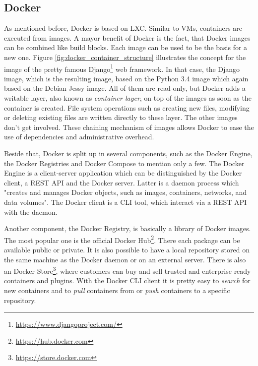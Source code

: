 \subsection{Docker}
As mentioned before, Docker is based on \ac{LXC}.
Similar to \acp{VM}, containers are executed from images.
A mayor benefit of Docker is the fact, that Docker images can be combined like build blocks.
Each image can be used to be the basis for a new one.
Figure \ref{fig:docker_container_structure} illustrates the concept for the image of the pretty famous Django\footnote{\url{https://www.djangoproject.com/}} web framework.
In that case, the Django image, which is the resulting image, based on the Python 3.4 image which again based on the Debian Jessy image.
All of them are read-only, but Docker adds a writable layer, also known as \textit{container layer}, on top of the images as soon as the container is created.
File system operations such as creating new files, modifying or deleting existing files are written directly to these layer.\autocite[cf.]{dockerImages}
The other images don't get involved.
These chaining mechanism of images allows Docker to ease the use of dependencies and administrative overhead.

Beside that, Docker is split up in several components, such as the Docker Engine, the Docker Registries and Docker Compose to mention only a few.
The Docker Engine is a client-server application which can be distinguished by the Docker client, a \ac{REST} \ac{API} and the Docker server.
Latter is a daemon process which "creates and manages Docker objects, such as images, containers, networks, and data volumes"\autocite{dockerEngine}.
The Docker client is a \ac{CLI} tool, which interact via a \ac{REST} \ac{API} with the daemon.\autocite[cf.]{dockerEngine}

Another component, the Docker Registry, is basically a library of Docker images.
The most popular one is the official Docker Hub\footnote{\url{https://hub.docker.com}}.
There each package can be available public or private.
It is also possible to have a local repository stored on the same machine as the Docker daemon or on an external server.\autocite[cf.]{dockerEngine}
There is also an Docker Store\footnote{\url{https://store.docker.com}}, where customers can buy and sell trusted and enterprise ready containers and plugins.
With the Docker \ac{CLI} client it is pretty easy to \textit{search} for new containers and to \textit{pull} containers from or \textit{push} containers to a specific repository.

